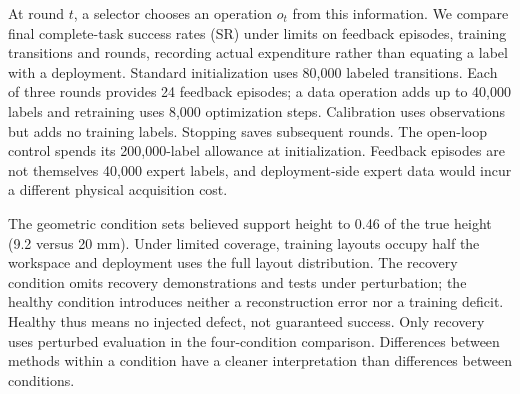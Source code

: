 At round $t$, a selector chooses an operation $o_t$ from this information. We compare final complete-task success rates (SR) under limits on feedback episodes, training transitions and rounds, recording actual expenditure rather than equating a label with a deployment. Standard initialization uses 80,000 labeled transitions. Each of three rounds provides 24 feedback episodes; a data operation adds up to 40,000 labels and retraining uses 8,000 optimization steps. Calibration uses observations but adds no training labels. Stopping saves subsequent rounds. The open-loop control spends its 200,000-label allowance at initialization. Feedback episodes are not themselves 40,000 expert labels, and deployment-side expert data would incur a different physical acquisition cost.

The geometric condition sets believed support height to 0.46 of the true height (9.2 versus 20 mm). Under limited coverage, training layouts occupy half the workspace and deployment uses the full layout distribution. The recovery condition omits recovery demonstrations and tests under perturbation; the healthy condition introduces neither a reconstruction error nor a training deficit. Healthy thus means no injected defect, not guaranteed success. Only recovery uses perturbed evaluation in the four-condition comparison. Differences between methods within a condition have a cleaner interpretation than differences between conditions.
